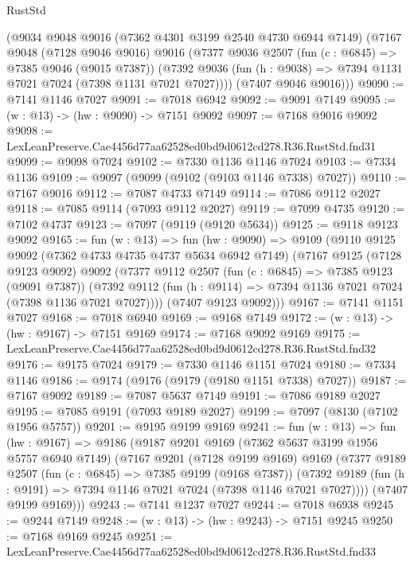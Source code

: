 \begin{lexlean}{RustStd}
\begin{coremodule}
    (@9034
      @9048
      @9016
      (@7362 @4301 @3199 @2540 @4730 @6944 @7149)
      (@7167
        @9048
        (@7128 @9046 @9016)
        @9016
        (@7377
          @9036
          @2507
          (fun (c : @6845) => @7385 @9046 (@9015 @7387))
          (@7392 @9036 (fun (h : @9038) => @7394 @1131 @7021 @7024 (@7398 @1131 @7021 @7027))))
        (@7407 @9046 @9016)))
@9090 := @7141 @1146 @7027
@9091 := @7018 @6942
@9092 := @9091 @7149
@9095 := (w : @13) -> (hw : @9090) -> @7151 @9092
@9097 := @7168 @9016 @9092
@9098 := LexLeanPreserve.Cae4456d77aa62528ed0bd9d0612cd278.R36.RustStd.fnd31
@9099 := @9098 @7024
@9102 := @7330 @1136 @1146 @7024
@9103 := @7334 @1136
@9109 := @9097 (@9099 (@9102 (@9103 @1146 @7338) @7027))
@9110 := @7167 @9016
@9112 := @7087 @4733 @7149
@9114 := @7086 @9112 @2027
@9118 := @7085 @9114 (@7093 @9112 @2027)
@9119 := @7099 @4735
@9120 := @7102 @4737
@9123 := @7097 (@9119 (@9120 @5634))
@9125 := @9118 @9123 @9092
@9165 := fun (w : @13) =>
  fun (hw : @9090) =>
  @9109
    (@9110
      @9125
      @9092
      (@7362 @4733 @4735 @4737 @5634 @6942 @7149)
      (@7167
        @9125
        (@7128 @9123 @9092)
        @9092
        (@7377
          @9112
          @2507
          (fun (c : @6845) => @7385 @9123 (@9091 @7387))
          (@7392 @9112 (fun (h : @9114) => @7394 @1136 @7021 @7024 (@7398 @1136 @7021 @7027))))
        (@7407 @9123 @9092)))
@9167 := @7141 @1151 @7027
@9168 := @7018 @6940
@9169 := @9168 @7149
@9172 := (w : @13) -> (hw : @9167) -> @7151 @9169
@9174 := @7168 @9092 @9169
@9175 := LexLeanPreserve.Cae4456d77aa62528ed0bd9d0612cd278.R36.RustStd.fnd32
@9176 := @9175 @7024
@9179 := @7330 @1146 @1151 @7024
@9180 := @7334 @1146
@9186 := @9174 (@9176 (@9179 (@9180 @1151 @7338) @7027))
@9187 := @7167 @9092
@9189 := @7087 @5637 @7149
@9191 := @7086 @9189 @2027
@9195 := @7085 @9191 (@7093 @9189 @2027)
@9199 := @7097 (@8130 (@7102 @1956 @5757))
@9201 := @9195 @9199 @9169
@9241 := fun (w : @13) =>
  fun (hw : @9167) =>
  @9186
    (@9187
      @9201
      @9169
      (@7362 @5637 @3199 @1956 @5757 @6940 @7149)
      (@7167
        @9201
        (@7128 @9199 @9169)
        @9169
        (@7377
          @9189
          @2507
          (fun (c : @6845) => @7385 @9199 (@9168 @7387))
          (@7392 @9189 (fun (h : @9191) => @7394 @1146 @7021 @7024 (@7398 @1146 @7021 @7027))))
        (@7407 @9199 @9169)))
@9243 := @7141 @1237 @7027
@9244 := @7018 @6938
@9245 := @9244 @7149
@9248 := (w : @13) -> (hw : @9243) -> @7151 @9245
@9250 := @7168 @9169 @9245
@9251 := LexLeanPreserve.Cae4456d77aa62528ed0bd9d0612cd278.R36.RustStd.fnd33

\end{coremodule}
\end{lexlean}
